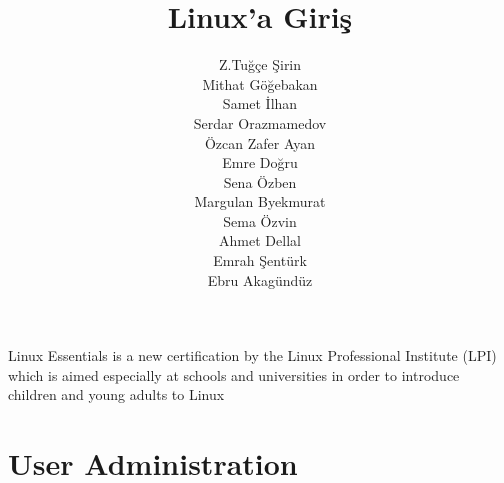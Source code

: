 \documentclass[10pt,a5paper]{book}
\begin{document}
\title{Linux'a Giriş}
\author{Z.Tuğçe Şirin\\
Mithat Göğebakan\\
Samet İlhan\\
Serdar Orazmamedov\\
Özcan Zafer Ayan\\
Emre Doğru\\
Sena Özben\\
Margulan Byekmurat\\
Sema Özvin\\
Ahmet Dellal\\
Emrah Şentürk\\
Ebru Akagündüz}
\renewcommand{\today}{December 13, 2012}
\renewcommand*\chaptername{Bölüm}
\maketitle
Linux Essentials is a new certification by the Linux Professional Institute (LPI) which is aimed especially at schools and universities in order to introduce children and young adults to Linux
\renewcommand*\contentsname{İçindekiler}
\tableofcontents
\listoftables












\chapter{User Administration}


\end{document}
